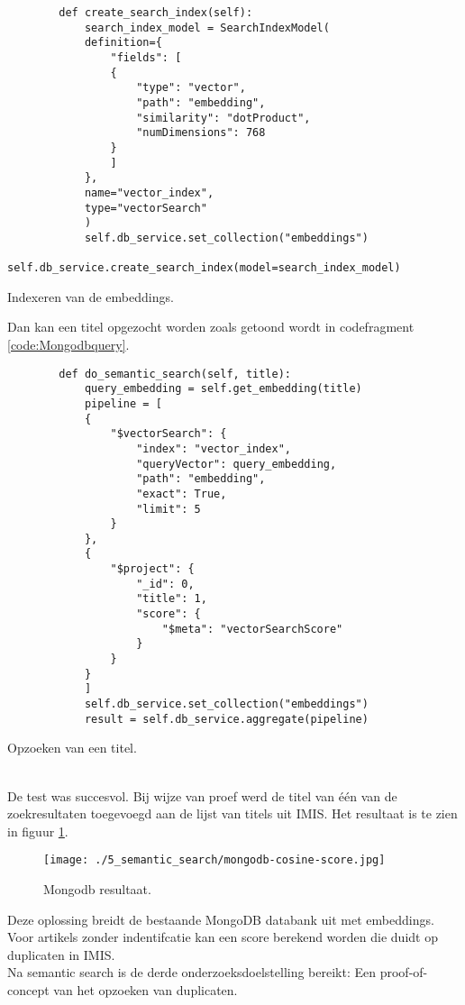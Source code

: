 \begin{listing}
    \begin{verbatim}
        def create_search_index(self):
            search_index_model = SearchIndexModel(
            definition={
                "fields": [
                {
                    "type": "vector",
                    "path": "embedding",
                    "similarity": "dotProduct",
                    "numDimensions": 768
                }
                ]
            },
            name="vector_index",
            type="vectorSearch"
            )
            self.db_service.set_collection("embeddings")
            self.db_service.create_search_index(model=search_index_model)
    \end{verbatim}
    \caption[MongoDB calculate index]{Indexeren van de embeddings.}
    \label{code:Mongodbindex}
\end{listing}
Dan kan een titel opgezocht worden zoals getoond wordt in codefragment \ref{code:Mongodbquery}.
\begin{listing}
    \begin{verbatim}
        def do_semantic_search(self, title):
            query_embedding = self.get_embedding(title)
            pipeline = [
            {
                "$vectorSearch": {
                    "index": "vector_index",
                    "queryVector": query_embedding,
                    "path": "embedding",
                    "exact": True,
                    "limit": 5
                }
            },
            {
                "$project": {
                    "_id": 0,
                    "title": 1,
                    "score": {
                        "$meta": "vectorSearchScore"
                    }
                }
            }
            ]
            self.db_service.set_collection("embeddings")
            result = self.db_service.aggregate(pipeline)
    \end{verbatim}
    \caption[MongoDB query]{Opzoeken van een titel.}
    \label{code:Mongodbquery}
\end{listing}
\\
De test was succesvol. Bij wijze van proef werd de titel van één van de zoekresultaten toegevoegd aan de lijst van titels uit IMIS. Het resultaat is te zien in figuur \ref{fig:Mongodb}.
\begin{figure}
    \centering
    \texttt{[image: ./5\_semantic\_search/mongodb-cosine-score.jpg]}
    \caption[Mongodb resultaat.]{\label{fig:Mongodb}Mongodb resultaat.}
\end{figure}
Deze oplossing breidt de bestaande MongoDB databank uit met embeddings. Voor artikels zonder indentifcatie kan een score berekend worden die duidt op duplicaten in IMIS.\\
Na semantic search is de derde onderzoeksdoelstelling bereikt: Een proof-of-concept van het opzoeken van duplicaten.
